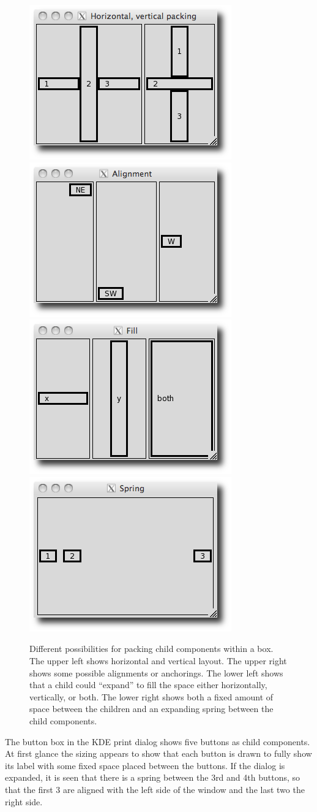 \begin{figure}
  \centering
  \includegraphics[width=.35\textwidth]{fig-basics-hor-ver}
  \includegraphics[width=.35\textwidth]{fig-basics-alignment}\\
  \includegraphics[width=.35\textwidth]{fig-basics-fill}
  \includegraphics[width=.35\textwidth]{fig-basics-spring}
  \caption{
    Different possibilities for packing child components within
    a box. 
    The upper left shows horizontal and vertical layout.
    The upper right shows some possible alignments or anchorings.
    The lower left shows that a child could ``expand'' to fill the space
    either horizontally, vertically, or both.
    The lower right shows both a fixed amount of space between the
    children and an expanding spring between the child components.  }
  \label{fig:GUI:box-possibilities}
\end{figure}

The button box in the KDE print dialog shows five buttons as child
components. At first glance the sizing appears to show that each
button is drawn to fully show its label with some fixed space placed
between the buttons. If the dialog is expanded, it is seen that there
is a spring between the 3rd and 4th buttons, so that the first 3 are
aligned with the left side of the window and the last two the right
side.

